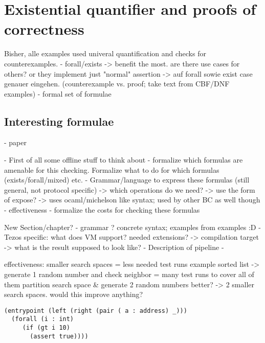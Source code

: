 \section{Existential quantifier and proofs of correctness}
Bisher, alle examples used univeral quantification and checks for counterexamples.
- forall/exists -> benefit the most. are there use cases for others? or they implement just "normal" assertion
	-> auf forall sowie exist case genauer eingehen. (counterexample vs. proof; take text from CBF/DNF examples)
- formal set of formulae

\subsection{Interesting formulae}\label{sec:example_formulae}
- paper


- First of all some offline stuff to think about - formalize which formulas are amenable for this checking. Formalize what to do for which formulas (exists/forall/mixed) etc.
- Grammar/language to express these formulas (still general, not protocol specific)
	-> which operations do we need?
	-> use the form of expose?
	-> uses ocaml/michelson like syntax; used by other BC as well though
- effectiveness
- formalize the costs for checking these formulas



New Section/chapter? %
- grammar ? concrete syntax; examples from examples :D
- Tezos specific: what does VM support? needed extensions?
	-> compilation target -> what is the result supposed to look like?
- Description of pipeline
- 



effectiveness:
smaller search spaces = less needed test runs
example sorted list -> generate 1 random number and check neighbor = many test runs to cover all of them
partition search space \& generate 2 random numbers better? -> 2 smaller search spaces. would this improve anything?



\begin{lstlisting}[numbers=none, language=Assertion]
(entrypoint (left (right (pair ( a : address) _)))
  (forall (i : int)
     (if (gt i 10)
       (assert true))))
\end{lstlisting}